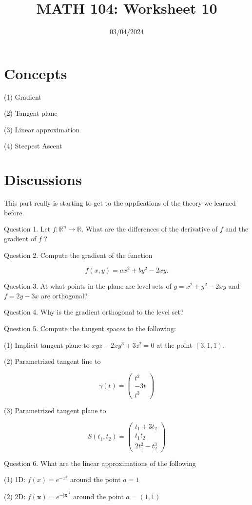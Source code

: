 \documentclass[12pt]{amsart}
\title{ MATH 104: Worksheet 10}
\author{}
\date{03/04/2024}
\begin{document}
\maketitle


\section{Concepts}

(1) Gradient

(2) Tangent plane

(3) Linear approximation

(4) Steepest Ascent

\section{Discussions}

This part really is starting to get to the applications of the theory we learned before.

Question 1. Let $f: \mathbb{R}^{n} \rightarrow \mathbb{R}$. What are the differences of the derivative of $f$ and the gradient of $f$ ?

Question 2. Compute the gradient of the function

$$
f(x, y)=a x^{2}+b y^{2}-2 x y .
$$

Question 3. At what points in the plane are level sets of $g=x^{2}+y^{2}-2 x y$ and $f=2 y-3 x$ are orthogonal?

Question 4. Why is the gradient orthogonal to the level set?

Question 5. Compute the tangent spaces to the following:

(1) Implicit tangent plane to $x y z-2 x y^{3}+3 z^{2}=0$ at the point $(3,1,1)$.

(2) Parametrized tangent line to

$$
\gamma(t)=\left(\begin{array}{c}
t^{2} \\
-3 t \\
t^{3}
\end{array}\right)
$$

(3) Parametrized tangent plane to

$$
S\left(t_{1}, t_{2}\right)=\left(\begin{array}{c}
t_{1}+3 t_{2} \\
t_{1} t_{2} \\
2 t_{1}^{2}-t_{2}^{3}
\end{array}\right)
$$

Question 6. What are the linear approximations of the following

(1) 1D: $f(x)=e^{-x^{2}}$ around the point $a=1$

(2) 2D: $f(\mathbf{x})=e^{-|\mathbf{x}|^{2}}$ around the point $a=(1,1)$
\end{document}

